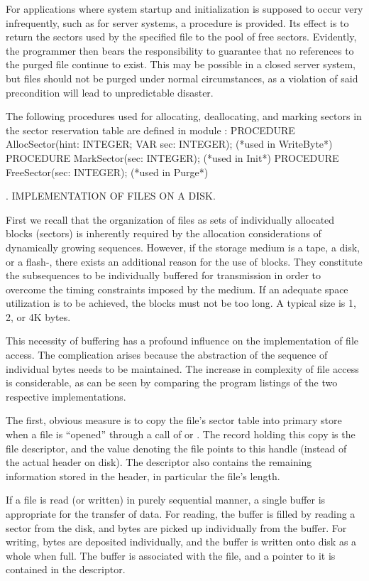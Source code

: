 For applications where system startup and initialization is supposed to occur very infrequently, such as for server systems, a procedure  is provided. Its effect is to return the sectors used by the specified file to the pool of free sectors. Evidently, the programmer then bears the responsibility to guarantee that no references to the purged file continue to exist. This may be possible in a closed server system, but files should not be purged under normal circumstances, as a violation of said precondition will lead to unpredictable disaster.

The following procedures used for allocating, deallocating, and marking sectors in the sector reservation table are defined in module :
\begintt
PROCEDURE AllocSector(hint: INTEGER; VAR sec: INTEGER); (*used in WriteByte*)
PROCEDURE MarkSector(sec: INTEGER); (*used in Init*)
PROCEDURE FreeSector(sec: INTEGER); (*used in Purge*)
\endtt

. IMPLEMENTATION OF FILES ON A DISK.

First we recall that the organization of files as sets of individually allocated blocks (sectors) is inherently required by the allocation considerations of dynamically growing sequences. However, if the storage medium is a tape, a disk, or a flash-, there exists an additional reason for the use of blocks. They constitute the subsequences to be individually buffered for transmission in order to overcome the timing constraints imposed by the medium. If an adequate space utilization is to be achieved, the blocks must not be too long. A typical size is 1, 2, or 4K bytes.

This necessity of buffering has a profound influence on the implementation of file access. The complication arises because the abstraction of the sequence of individual bytes needs to be maintained. The increase in complexity of file access is considerable, as can be seen by comparing the program listings of the two respective implementations.

The first, obvious measure is to copy the file's sector table into primary store when a file is ``opened'' through a call of  or . The record holding this copy is the file descriptor, and the value  denoting the file points to this handle (instead of the actual header on disk). The descriptor also contains the remaining information stored in the header, in particular the file's length.

If a file is read (or written) in purely sequential manner, a single buffer is appropriate for the transfer of data. For reading, the buffer is filled by reading a sector from the disk, and bytes are picked up individually from the buffer. For writing, bytes are deposited individually, and the buffer is written onto disk as a whole when full. The buffer is associated with the file, and a pointer to it is contained in the descriptor.

